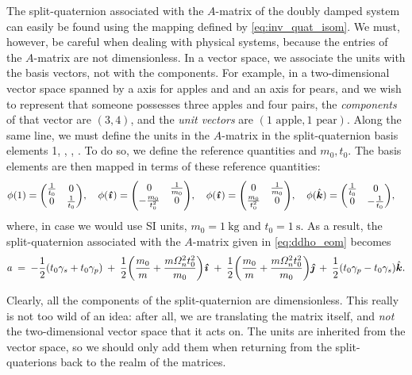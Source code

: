 The split-quaternion associated with the $A$-matrix of the doubly damped system can easily be found using the mapping defined by \cref{eq:inv_quat_isom}. We must, however, be careful when dealing with physical systems, because the entries of the $A$-matrix are not dimensionless. In a vector space, we associate the units with the basis vectors, not with the components. For example, in a two-dimensional vector space spanned by a axis for apples and and an axis for pears, and we wish to represent that someone possesses three apples and four pairs, the \emph{components} of that vector are $(3, 4)$, and the \emph{unit vectors} are $(1 \text{ apple}, 1\text{ pear})$. Along the same line, we must define the units in the $A$-matrix in the split-quaternion basis elements 1, \quati, \quatj, \quatk. To do so, we define the reference quantities and $m_0, t_0$. The basis elements are then mapped in terms of these reference quantities:
$$ 
    \phi(1) = \mqty(\tfrac{1}{t_0} & 0 \\ 0 & \tfrac{1}{t_0}), \quad 
    \phi(\quati) = \mqty(0 & \tfrac{1}{m_0} \\  -\tfrac{m_0}{t_0^2} & 0), \quad
    \phi(\quati) = \mqty(0 & \tfrac{1}{m_0} \\  \tfrac{m_0}{t_0^2} & 0), \quad
    \phi(\quatk) = \mqty(\tfrac{1}{t_0} & 0 \\ 0 & -\tfrac{1}{t_0}), \quad 
$$
where, in case we would use SI units, $m_0 = \SI{1}{\kilogram}$ and $t_0 = \SI{1}{\second}$. As a result, the split-quaternion associated with the $A$-matrix given in \cref{eq:ddho_eom} becomes
\begin{equation}
    a\:=\: -\frac{1}{2}\qty(t_0\gamma_s + t_0\gamma_p)\:+\:\frac{1}{2}\qty(\frac{m_0}{m} + \frac{m\Omega_n^2 t_0^2}{m_0})\quati\:+\:\frac{1}{2}\qty(\frac{m_0}{m} + \frac{m\Omega_n^2 t_0^2}{m_0})\quatj\:+\:\frac{1}{2}\qty(t_0\gamma_p - t_0\gamma_s)\quatk. 
    \label{eq:ddho_quat_units}
\end{equation}

Clearly, all the components of the split-quaternion are dimensionless. This really is not too wild of an idea: after all, we are translating the matrix itself, and \emph{not} the two-dimensional vector space that it acts on. The units are inherited from the vector space, so we should only add them when returning from the split-quaterions back to the realm of the matrices. 

